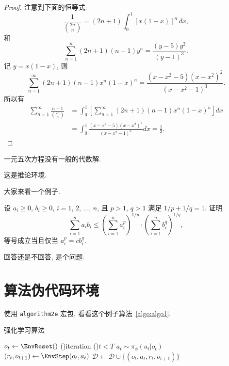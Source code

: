 \begin{proof}
注意到下面的恒等式:
\[
\frac{1}{\binom{2n}{n}}=(2n+1)\int_0^1[x(1-x)]^n\,dx,
\]
和
\[
\sum_{n=1}^{\infty}(2n+1)(n-1)y^n=\frac{(y-5)y^2}{(y-1)^3}.
\]
记 $y=x(1-x)$, 则
\[
\sum_{n=1}^{\infty}(2n+1)(n-1)x^n(1-x)^n=\frac{(x-x^2-5)(x-x^2)^2}{(x-x^2-1)^3}.
\]
所以有
\begin{align*}
\sum_{n=1}^{\infty}\frac{n-1}{\binom{2n}{n}} & =
\int_0^1\left[\sum_{n=1}^{\infty}(2n+1)(n-1)x^n(1-x)^n\right]dx\\
& =\int_0^1\frac{(x-x^2-5)(x-x^2)^2}{(x-x^2-1)^3}dx=\frac13.
\end{align*}
\end{proof}

\begin{theorem}\label{the:theorem1}
一元五次方程没有一般的代数解.
\end{theorem}

\begin{corollary}
这是推论环境.
\end{corollary}

\begin{example}
大家来看一个例子.
\end{example}

\begin{exercise}
设 $a_i\geq0$, $b_i\geq0$, $i=1$, $2$, $\ldots$, $n$, 
且 $p>1$, $q>1$ 满足 $1/p+1/q=1$. 证明
\[
\sum_{i=1}^{n}a_ib_i\leq\left(\sum_{i=1}^{n}a_i^p\right)^{1/p}
\cdot\left(\sum_{i=1}^{n}b_i^q\right)^{1/q},
\]
等号成立当且仅当 $a_i^p=cb_i^q$.
\end{exercise}

\begin{problem}
回答还是不回答, 是个问题. 
\end{problem}

\newpage
\section{算法伪代码环境}

使用 \texttt{algorithm2e} 宏包, 看看这个例子算法~\ref{algo:algo1}.

\begin{algorithm}[!htbp]
  \caption{强化学习算法}
  \label{algo:algo1}
  \DontPrintSemicolon
  \vspace{5pt}

  \Output{$\phi$}

  $o_t \leftarrow \EnvReset()$\;
  \Forever(){iteration}{
    \While(){$t<T$}{
      $a_t\sim \pi_\phi(a_t|o_t)$ 
      $(r_t,o_{t+1}) \leftarrow \EnvStep(o_t,a_t)$ 
      $\mathcal{D} \leftarrow \mathcal{D} \cup \{(o_t,a_t,r_t,o_{t+1})\}$ 
    }
  }
\end{algorithm}